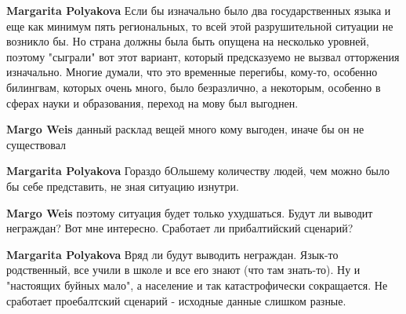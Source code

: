 \begin{itemize}
\begin{itemize}
 
\textbf{Margarita Polyakova} Если бы изначально было два государственных языка и еще как минимум пять региональных, то всей этой разрушительной ситуации не возникло бы. Но страна должны была быть опущена на несколько уровней, поэтому "сыграли" вот этот вариант, который предсказуемо не вызвал отторжения изначально. Многие думали, что это временные перегибы, кому-то, особенно билингвам, которых очень много, было безразлично, а некоторым, особенно в сферах науки и образования, переход на мову был выгоднен.

 
\textbf{Margo Weis} данный расклад вещей много кому выгоден, иначе бы он не существовал

 
\textbf{Margarita Polyakova} Гораздо бОльшему количеству людей, чем можно было бы себе представить, не зная ситуацию изнутри.

 
\textbf{Margo Weis} поэтому ситуация будет только ухудшаться. Будут ли выводит неграждан? Вот мне интересно. Сработает ли прибалтийский сценарий?

 
\textbf{Margarita Polyakova} Вряд ли будут выводить неграждан. Язык-то
родственный, все учили в школе и все его знают (что там знать-то). Ну и
"настоящих буйных мало", а население и так катастрофически сокращается. Не
сработает проебалтский сценарий - исходные данные слишком разные.


\end{itemize}
\end{itemize}
